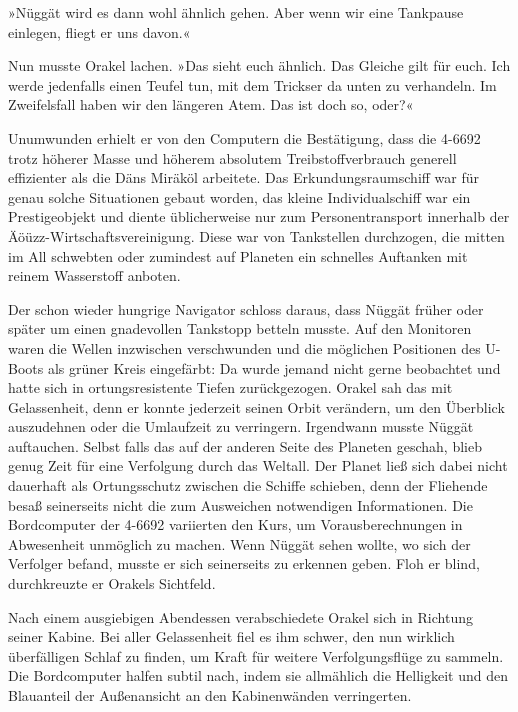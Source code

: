 »Nüggät wird es dann wohl ähnlich gehen. Aber wenn wir eine Tankpause einlegen, fliegt er uns davon.«


Nun musste Orakel lachen. »Das sieht euch ähnlich. Das Gleiche gilt für euch. Ich werde jedenfalls einen Teufel tun, mit dem Trickser da unten zu verhandeln. Im Zweifelsfall haben wir den längeren Atem. Das ist doch so, oder?«

Unumwunden erhielt er von den Computern die Bestätigung, dass die 4-6692 trotz höherer Masse und höherem absolutem Treibstoffverbrauch generell effizienter als die Däns Miräköl arbeitete. Das Erkundungsraumschiff war für genau solche Situationen gebaut worden, das kleine Individualschiff war ein Prestigeobjekt und diente üblicherweise nur zum Personentransport innerhalb der Äöüzz-Wirtschaftsvereinigung. Diese war von Tankstellen durchzogen, die mitten im All schwebten oder zumindest auf Planeten ein schnelles Auftanken mit reinem Wasserstoff anboten.

Der schon wieder hungrige Navigator schloss daraus, dass Nüggät früher oder später um einen gnadevollen Tankstopp betteln musste. Auf den Monitoren waren die Wellen inzwischen verschwunden und die möglichen Positionen des U-Boots als grüner Kreis eingefärbt: Da wurde jemand nicht gerne beobachtet und hatte sich in ortungsresistente Tiefen zurückgezogen. Orakel sah das mit Gelassenheit, denn er konnte jederzeit seinen Orbit verändern, um den Überblick auszudehnen oder die Umlaufzeit zu verringern. Irgendwann musste Nüggät auftauchen. Selbst falls das auf der anderen Seite des Planeten geschah, blieb genug Zeit für eine Verfolgung durch das Weltall. Der Planet ließ sich dabei nicht dauerhaft als Ortungsschutz zwischen die Schiffe schieben, denn der Fliehende besaß seinerseits nicht die zum Ausweichen notwendigen Informationen. Die Bordcomputer der 4-6692 variierten den Kurs, um Vorausberechnungen in Abwesenheit unmöglich zu machen. Wenn Nüggät sehen wollte, wo sich der Verfolger befand, musste er sich seinerseits zu erkennen geben. Floh er blind, durchkreuzte er Orakels Sichtfeld.

Nach einem ausgiebigen Abendessen verabschiedete Orakel sich in Richtung seiner Kabine. Bei aller Gelassenheit fiel es ihm schwer, den nun wirklich überfälligen Schlaf zu finden, um Kraft für weitere Verfolgungsflüge zu sammeln. Die Bordcomputer halfen subtil nach, indem sie allmählich die Helligkeit und den Blauanteil der Außenansicht an den Kabinenwänden verringerten.

